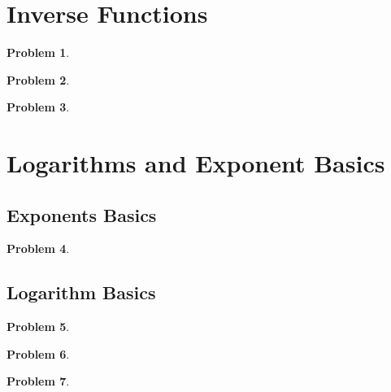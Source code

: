 \documentclass{article}
\newtheorem{problem}{Problem}
\begin{document}
\section{Inverse Functions}\label{secMPSInverseFunctions}
\begin{problem}

\end{problem}


\begin{problem}

\end{problem}


\begin{problem}

\end{problem}


\section{Logarithms and Exponent Basics}\label{secMPSLogarithmsExponentsBasics}
\subsection{Exponents Basics}
\begin{problem}

\end{problem}


\subsection{Logarithm Basics}
\begin{problem}

\end{problem}

\begin{problem}

\end{problem}

\begin{problem}

\end{problem}

\end{document}

